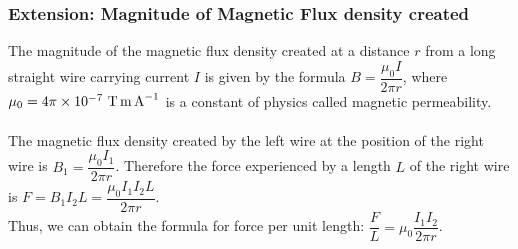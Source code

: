 \documentclass[a4paper,12pt]{article}
\begin{document}
\subsubsection*{Extension: Magnitude of Magnetic Flux density created}
 The magnitude of the magnetic flux density created at a distance $r$ from a long straight
wire carrying current $I$ is given by the formula $B=\dfrac{\mu_0I}{2\pi r}$, where $\mu_0=4\pi\times 10^{-7}\ \text{T\,m\,A}^{-1}$ is a constant of
physics called magnetic permeability. \\\\
The magnetic flux density
created by the left wire at the position of the right wire is $B_1=\dfrac{\mu_0I_1}{2\pi r}$. 
Therefore the force experienced by a length $L$ of the right wire is $F=B_1I_2L=\dfrac{\mu_0I_1I_2L}{2\pi r}$.\\
Thus, we can obtain the formula for force per unit length: $\dfrac{F}{L}=\mu_0\dfrac{I_1I_2}{2\pi r}$.
\end{document}
